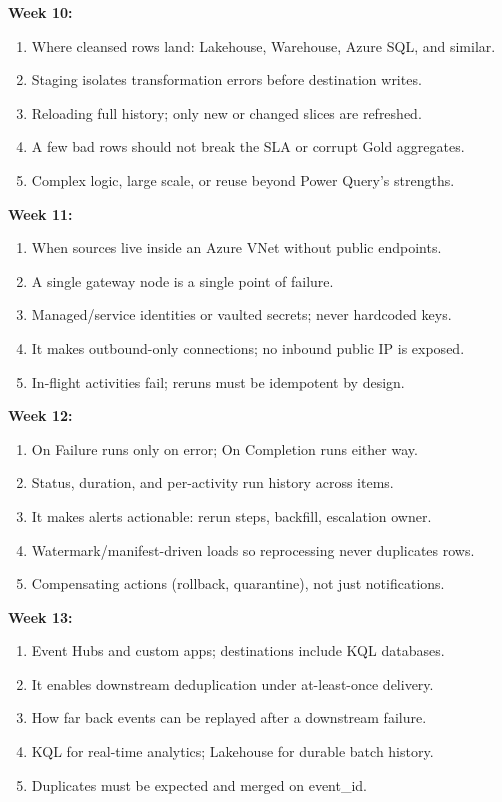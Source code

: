 \documentclass[11pt, a4paper]{article}
\begin{document}
\noindent\textbf{Week 10:}
\begin{enumerate}[leftmargin=8mm, itemsep=0pt]
    \item Where cleansed rows land: Lakehouse, Warehouse, Azure SQL, and similar.
    \item Staging isolates transformation errors before destination writes.
    \item Reloading full history; only new or changed slices are refreshed.
    \item A few bad rows should not break the SLA or corrupt Gold aggregates.
    \item Complex logic, large scale, or reuse beyond Power Query's strengths.
\end{enumerate}

\noindent\textbf{Week 11:}
\begin{enumerate}[leftmargin=8mm, itemsep=0pt]
    \item When sources live inside an Azure VNet without public endpoints.
    \item A single gateway node is a single point of failure.
    \item Managed/service identities or vaulted secrets; never hardcoded keys.
    \item It makes outbound-only connections; no inbound public IP is exposed.
    \item In-flight activities fail; reruns must be idempotent by design.
\end{enumerate}

\noindent\textbf{Week 12:}
\begin{enumerate}[leftmargin=8mm, itemsep=0pt]
    \item On Failure runs only on error; On Completion runs either way.
    \item Status, duration, and per-activity run history across items.
    \item It makes alerts actionable: rerun steps, backfill, escalation owner.
    \item Watermark/manifest-driven loads so reprocessing never duplicates rows.
    \item Compensating actions (rollback, quarantine), not just notifications.
\end{enumerate}

\noindent\textbf{Week 13:}
\begin{enumerate}[leftmargin=8mm, itemsep=0pt]
    \item Event Hubs and custom apps; destinations include KQL databases.
    \item It enables downstream deduplication under at-least-once delivery.
    \item How far back events can be replayed after a downstream failure.
    \item KQL for real-time analytics; Lakehouse for durable batch history.
    \item Duplicates must be expected and merged on event\_id.
\end{enumerate}
\end{document}
